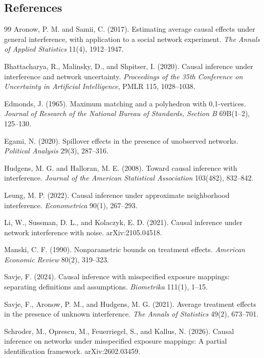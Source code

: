 \documentclass[11pt]{article}
\theoremstyle{definition}
\theoremstyle{plain}
\theoremstyle{remark}
\begin{document}
\subsection*{References}
\begin{thebibliography}{99}
Aronow, P. M. and Samii, C. (2017).
Estimating average causal effects under general interference, with application
to a social network experiment.
\emph{The Annals of Applied Statistics} 11(4), 1912--1947.

Bhattacharya, R., Malinsky, D., and Shpitser, I. (2020).
Causal inference under interference and network uncertainty.
\emph{Proceedings of the 35th Conference on Uncertainty in Artificial
Intelligence}, PMLR 115, 1028--1038.

Edmonds, J. (1965).
Maximum matching and a polyhedron with 0,1-vertices.
\emph{Journal of Research of the National Bureau of Standards, Section B}
69B(1--2), 125--130.

Egami, N. (2020).
Spillover effects in the presence of unobserved networks.
\emph{Political Analysis} 29(3), 287--316.

Hudgens, M. G. and Halloran, M. E. (2008).
Toward causal inference with interference.
\emph{Journal of the American Statistical Association} 103(482), 832--842.

Leung, M. P. (2022).
Causal inference under approximate neighborhood interference.
\emph{Econometrica} 90(1), 267--293.

Li, W., Sussman, D. L., and Kolaczyk, E. D. (2021).
Causal inference under network interference with noise.
arXiv:2105.04518.

Manski, C. F. (1990).
Nonparametric bounds on treatment effects.
\emph{American Economic Review} 80(2), 319--323.

Savje, F. (2024).
Causal inference with misspecified exposure mappings: separating definitions
and assumptions.
\emph{Biometrika} 111(1), 1--15.

Savje, F., Aronow, P. M., and Hudgens, M. G. (2021).
Average treatment effects in the presence of unknown interference.
\emph{The Annals of Statistics} 49(2), 673--701.

Schroder, M., Oprescu, M., Feuerriegel, S., and Kallus, N. (2026).
Causal inference on networks under misspecified exposure mappings: A partial
identification framework.
arXiv:2602.03459.


\end{thebibliography}
\end{document}
